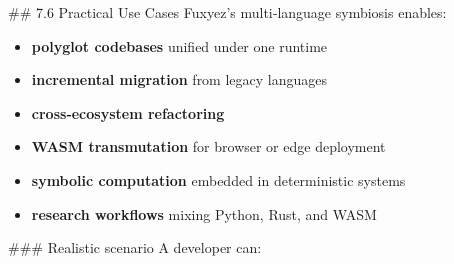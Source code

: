 \#\# 7.6 Practical Use Cases  
Fuxyez’s multi‑language symbiosis enables:

\begin{itemize}
  \item \textbf{polyglot codebases} unified under one runtime  
  \item \textbf{incremental migration} from legacy languages  
  \item \textbf{cross‑ecosystem refactoring}  
  \item \textbf{WASM transmutation} for browser or edge deployment  
  \item \textbf{symbolic computation} embedded in deterministic systems  
  \item \textbf{research workflows} mixing Python, Rust, and WASM  
\end{itemize}

\#\#\# Realistic scenario  
A developer can:

